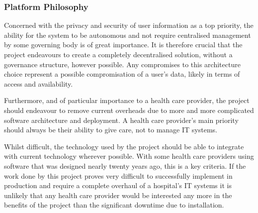 \subsubsection{Platform Philosophy}

Concerned with the privacy and security of user information as a top priority, the ability for the system to be autonomous and not require centralised management by some governing body is of great importance. It is therefore crucial that the project endeavours to create a completely decentralised solution, without a governance structure, however possible. Any compromises to this architecture choice represent a possible compromisation of a user's data, likely in terms of access and availability.

Furthermore, and of particular importance to a health care provider, the project should endeavour to remove current overheads due to more and more complicated software architecture and deployment. A health care provider's main priority should always be their ability to give care, not to manage IT systems.

Whilst difficult, the technology used by the project should be able to integrate with current technology wherever possible. With some health care providers using software that was designed nearly twenty years ago, this is a key criteria. If the work done by this project proves very difficult to successfully implement in production and require a complete overhaul of a hospital's IT systems it is unlikely that any health care provider would be interested any more in the benefits of the project than the significant downtime due to installation.
